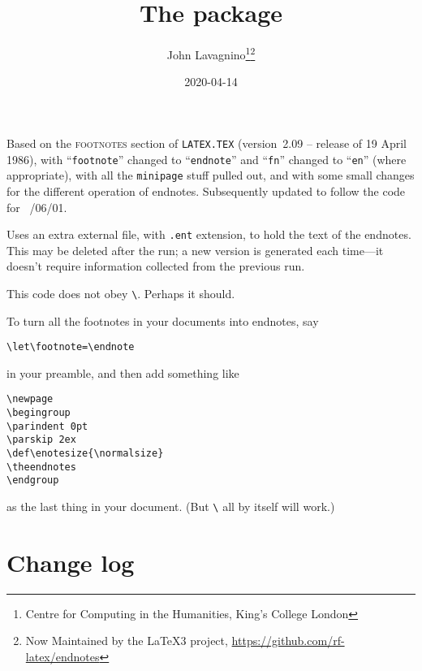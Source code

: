 \documentclass[pagesize=auto]{scrartcl}
\title{The \pkg{endnotes} package}
\author{John Lavagnino\thanks{Centre for Computing in the Humanities, King's College London}\thanks{Now Maintained by the \LaTeX3 project, \url{https://github.com/rf-latex/endnotes}}}
\date{2020-04-14}
\makeatletter
\newcommand*{\cs}[1]{\texttt{\textbackslash#1}}
\newcommand*{\cmd}[1]{\cs{\expandafter\@gobble\string#1}}
\newcommand*{\env}[1]{\texttt{#1}}
\makeatother
\begin{document}
\maketitle

\noindent
Based on the \textsc{footnotes} section of
\texttt{LATEX.TEX} (version~2.09 -- release of 19 April 1986), with
``\texttt{footnote}'' changed to ``\texttt{endnote}'' and ``\texttt{fn}'' changed to ``\texttt{en}'' (where
appropriate), with all the \env{minipage} stuff pulled out, and with
some small changes for the different operation of endnotes.
Subsequently updated to follow the code for
\LaTeXe\ /06/01\textrangle.

Uses an extra external file, with \texttt{.ent} extension, to hold the
text of the endnotes.  This may be deleted after the run; a new
version is generated each time---it doesn't require information
collected from the previous run.

This code does not obey \cmd{\nofiles}.  Perhaps it should.

\bigskip

To turn all the footnotes in your documents into endnotes, say
%
\begin{verbatim}
\let\footnote=\endnote
\end{verbatim}
%
in your preamble, and then add something like
%
\begin{verbatim}
\newpage
\begingroup
\parindent 0pt
\parskip 2ex
\def\enotesize{\normalsize}
\theendnotes
\endgroup
\end{verbatim}
%
as the last thing in your document.  (But \cmd{\theendnotes} all
by itself will work.)


\section{Change log}

\renewcommand*{\labelenumi}{\theenumi)}
\end{document}
